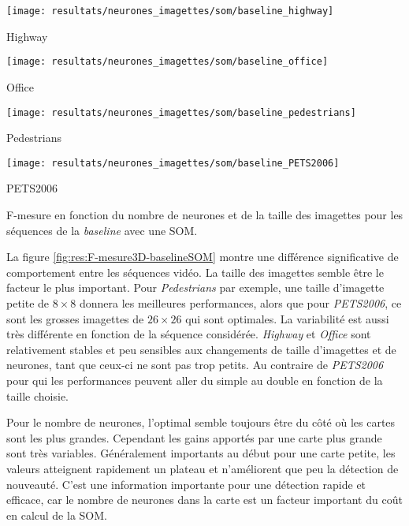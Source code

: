 	\begin{figureth}
		\begin{subfigureth}{.45\textwidth}
			\texttt{[image: resultats/neurones\_imagettes/som/baseline\_highway]}\caption{Highway}
		\end{subfigureth}
		\hfill
		\begin{subfigureth}{.45\textwidth}
			\texttt{[image: resultats/neurones\_imagettes/som/baseline\_office]}\caption{Office}
		\end{subfigureth}
		\begin{subfigureth}{.45\textwidth}
			\texttt{[image: resultats/neurones\_imagettes/som/baseline\_pedestrians]}\caption{Pedestrians}
		\end{subfigureth}
		\hfill
		\begin{subfigureth}{.45\textwidth}
			\texttt{[image: resultats/neurones\_imagettes/som/baseline\_PETS2006]}\caption{PETS2006}
		\end{subfigureth}
		\caption[Nombre de neurones et de taille des imagettes, SOM/baseline]{F-mesure en fonction du nombre de neurones et de la taille des imagettes pour les séquences de la \textit{baseline} avec une SOM.}\label{fig:res:F-mesure3D-baselineSOM}
	\end{figureth}

	La figure \ref{fig:res:F-mesure3D-baselineSOM} montre une différence significative de comportement entre les séquences vidéo. La taille des imagettes semble être le facteur le plus important. Pour \textit{Pedestrians} par exemple, une taille d'imagette petite de $8\times8$ donnera les meilleures performances, alors que pour \textit{PETS2006}, ce sont les grosses imagettes de $26\times26$ qui sont optimales. La variabilité est aussi très différente en fonction de la séquence considérée. \textit{Highway} et \textit{Office} sont relativement stables et peu sensibles aux changements de taille d'imagettes et de neurones, tant que ceux-ci ne sont pas trop petits. Au contraire de \textit{PETS2006} pour qui les performances peuvent aller du simple au double en fonction de la taille choisie.

	Pour le nombre de neurones, l'optimal semble toujours être du côté où les cartes sont les plus grandes. Cependant les gains apportés par une carte plus grande sont très variables. Généralement importants au début pour une carte petite, les valeurs atteignent rapidement un plateau et n'améliorent que peu la détection de nouveauté. C'est une information importante pour une détection rapide et efficace, car le nombre de neurones dans la carte est un facteur important du coût en calcul de la SOM.

